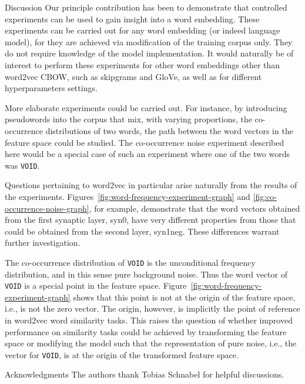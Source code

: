 \documentclass{article} %
\newcommand{\word}[1]{\texttt{#1}}
\begin{document}
\begin{section}{Discussion}\label{future-directions}
Our principle contribution has been to demonstrate that controlled
experiments can be used to gain insight into a word embedding.  These
experiments can be carried out for any word embedding (or indeed
language model), for they are achieved via modification of the training
corpus only.  They do not require knowledge of the model implementation.
It would naturally be of interest to perform these experiments for other
word embeddings other than word2vec CBOW, such as skipgrams and GloVe,
as well as for different hyperparameters settings.

More elaborate experiments could be carried out.  For instance, by
introducing pseudowords into the corpus that mix, with varying proportions,
the co-occurrence distributions of two words, the path between the word
vectors in the feature space could be studied.  The co-occurrence noise
experiment described here would be a special case of such an
experiment where one of the two words was \word{VOID}.

Questions pertaining to word2vec in particular arise naturally from the
results of the experiments.
Figures~\ref{fig:word-frequency-experiment-graph} and
\ref{fig:co-occurrence-noise-graph}, for example, demonstrate that the
word vectors obtained from the first synaptic layer, syn0, have very
different properties from those that could be obtained from the second
layer, syn1neg.  These differences warrant further investigation.

The co-occurrence distribution of \word{VOID} is the unconditional
frequency distribution, and in this sense pure background noise.  Thus
the word vector of \word{VOID} is a special point in the feature space.
Figure~\ref{fig:word-frequency-experiment-graph} shows that this point
is not at the origin of the feature space, i.e., is not the zero vector.
The origin, however, is implicitly the point of reference in word2vec
word similarity tasks.  This raises the question of whether improved
performance on similarity tasks could be achieved by transforming the
feature space or modifying the model such that the representation of
pure noise, i.e., the vector for \word{VOID}, is at the origin of the
transformed feature space.
\end{section}

\begin{section}{Acknowledgments}
The authors thank Tobias Schnabel for helpful discussions.
\end{section}

\clearpage
\footnotesize


\end{document}
